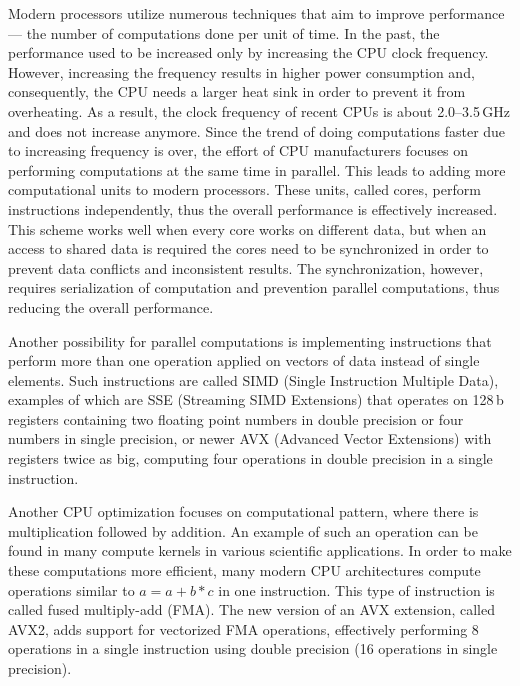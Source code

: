 Modern processors utilize numerous techniques that aim to improve performance --- the number of computations done per unit of time. In the past, the performance used to be increased only by increasing the CPU clock frequency. However, increasing the frequency results in higher power consumption and, consequently, the CPU needs a larger heat sink in order to prevent it from overheating. As a result, the clock frequency of recent CPUs is about 2.0--3.5\,GHz and does not increase anymore.
Since the trend of doing computations faster due to increasing frequency is over, the effort of CPU manufacturers focuses on performing computations at the same time in parallel.
This leads to adding more computational units to modern processors. These units, called cores, perform instructions independently, thus the overall performance is effectively increased. This scheme works well when every core works on different data, but when an access to shared data is required the cores need to be synchronized in order to prevent data conflicts and inconsistent results. The synchronization, however, requires serialization of computation and prevention parallel computations, thus reducing the overall performance.

Another possibility for parallel computations is implementing instructions that perform more than one operation applied on vectors of data instead of single elements. Such instructions are called SIMD (Single Instruction Multiple Data), examples of which are SSE (Streaming SIMD Extensions) that operates on 128\,b registers containing two floating point numbers in double precision or four numbers in single precision, or newer AVX (Advanced Vector Extensions) with registers twice as big, computing four operations in double precision in a single instruction.

Another CPU optimization focuses on computational pattern, where there is multiplication followed by addition. An example of such an operation can be found in many compute kernels in various scientific applications. In order to make these computations more efficient, many modern CPU architectures compute operations similar to $a=a+b*c$ in one instruction. This type of instruction is called fused multiply-add (FMA).
The new version of an AVX extension, called AVX2, adds support for vectorized FMA operations, effectively performing 8 operations in a single instruction using double precision (16 operations in single precision).

